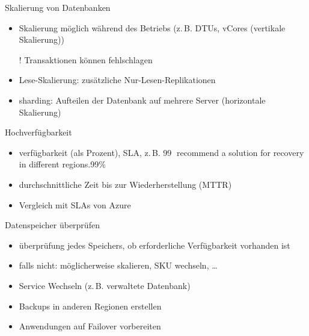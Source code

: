 \begin{flashcard}[]{Skalierung von Datenbanken}
  \begin{itemize}
    \item Skalierung möglich während des Betriebs (z.\,B. DTUs, vCores (vertikale Skalierung))
    \item[!] Transaktionen können fehlschlagen
    \item Lese-Skalierung: zusätzliche Nur-Lesen-Replikationen
    \item sharding: Aufteilen der Datenbank auf mehrere Server (horizontale Skalierung)
  \end{itemize}
\end{flashcard}


\begin{flashcard}[]{Hochverfügbarkeit}
  \begin{itemize}
    \item verfügbarkeit (als Prozent), SLA, z.\,B. 99 recommend a solution for recovery in different regions.99\%
    \item durchschnittliche Zeit bis zur Wiederherstellung (MTTR)
    \item Vergleich mit SLAs von Azure
  \end{itemize}
\end{flashcard}

\begin{flashcard}[]{Datenspeicher überprüfen}
  \begin{itemize}
    \item überprüfung jedes Speichers, ob erforderliche Verfügbarkeit vorhanden ist
    \item falls nicht: möglicherweise skalieren, SKU wechseln, \ldots
    \item Service Wechseln (z.\,B. verwaltete Datenbank)
    \item Backups in anderen Regionen erstellen
    \item Anwendungen auf Failover vorbereiten
  \end{itemize}
\end{flashcard}


